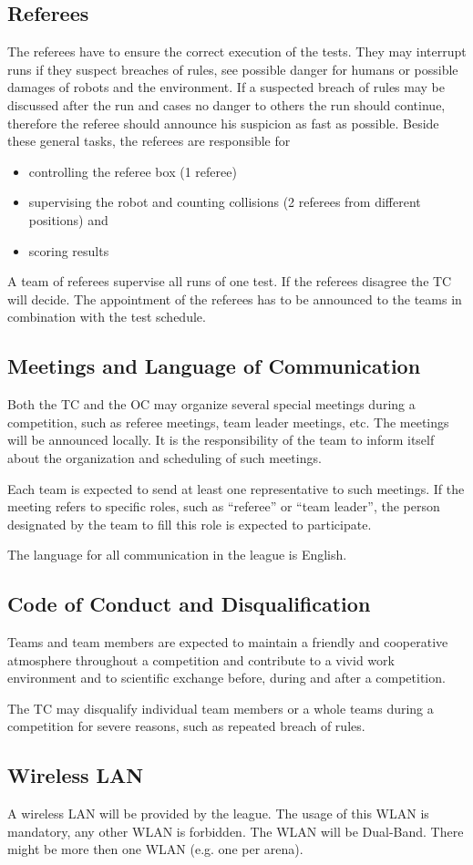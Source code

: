 \subsection{Referees}
The referees have to ensure the correct execution of the tests. They may interrupt runs if they suspect breaches of rules, see possible danger for humans or possible damages of robots and the environment. If a suspected breach of rules may be discussed after the run and cases no danger to others the run should continue, therefore the referee should  announce his suspicion as fast as possible. Beside these general tasks, the referees are responsible for
\begin{itemize}
\item controlling the referee box (1 referee)
\item supervising the robot and counting collisions (2 referees from different positions) and
\item scoring results
\end{itemize}
A team of referees supervise all runs of one test. If the referees disagree the TC will decide. The appointment of the referees has to be announced to the teams in combination with the test schedule.

\subsection{Meetings and Language of Communication}
Both the TC and the OC may organize several special meetings during a competition, such as referee meetings, team leader meetings, etc. The meetings will be announced locally. It is the responsibility of the team to inform itself about the organization and scheduling of such meetings.
\par
Each team is expected to send at least one representative to such meetings. If the meeting refers to specific roles, such as “referee” or “team leader”, the person designated by the team to fill this role is expected to participate.
\par
The language for all communication in the league is English.

\subsection{Code of Conduct and Disqualification}
Teams and team members are expected to maintain a friendly and cooperative atmosphere throughout a competition and contribute to a vivid work environment and to scientific exchange before, during and after a competition.
\par
The TC may disqualify individual team members or a whole teams during a competition for severe reasons, such as repeated breach of rules. 

\subsection{Wireless LAN}
A wireless LAN will be provided by the league. The usage of this WLAN is mandatory, any other WLAN is forbidden. The WLAN will be Dual-Band. There might be more then one WLAN (e.g. one per arena). 


